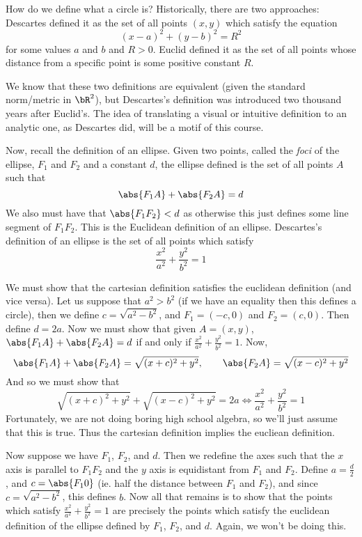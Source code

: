 How do we define what a circle is?
Historically, there are two approaches: Descartes defined it as the set of all points $(x,y)$ which satisfy the equation
\[ (x-a)^2 + (y-b)^2 = R^2 \]
for some values $a$ and $b$ and $R>0$.
Euclid defined it as the set of all points whose distance from a specific point is some positive constant $R$.

We know that these two definitions are equivalent (given the standard norm/metric in $\bR^2$), but Descartes's definition was introduced two thousand years after Euclid's.
The idea of translating a visual or intuitive definition to an analytic one, as Descartes did, will be a motif of this course.

Now, recall the definition of an ellipse.
Given two points, called the \emph{foci} of the ellipse, $F_1$ and $F_2$ and a constant $d$, the ellipse defined is the set of all points $A$ such that
\[ \abs{F_1A} + \abs{F_2A} = d \]
We also must have that $\abs{F_1F_2}<d$ as otherwise this just defines some line segment of $F_1F_2$.
This is the Euclidean definition of an ellipse.
Descartes's definition of an ellipse is the set of all points which satisfy
\[ \frac{x^2}{a^2} + \frac{y^2}{b^2} = 1 \]

We must show that the cartesian definition satisfies the euclidean definition (and vice versa).
Let us suppose that $a^2>b^2$ (if we have an equality then this defines a circle), then we define $c=\sqrt{a^2-b^2}$, and $F_1=(-c,0)$ and $F_2=(c,0)$.
Then define $d=2a$.
Now we must show that given $A=(x,y)$, $\abs{F_1A}+\abs{F_2A}=d$ if and only if $\frac{x^2}{a^2} + \frac{y^2}{b^2} = 1$.
Now,
\[ \abs{F_1A} + \abs{F_2A} = \sqrt{(x+c)^2 + y^2},\qquad \abs{F_2A} = \sqrt{(x-c)^2 + y^2} \]
And so we must show that
\[ \sqrt{(x+c)^2 + y^2} + \sqrt{(x-c)^2 + y^2} = 2a \iff \frac{x^2}{a^2} + \frac{y^2}{b^2} = 1 \]
Fortunately, we are not doing boring high school algebra, so we'll just assume that this is true.
Thus the cartesian definition implies the eucliean definition.

Now suppose we have $F_1$, $F_2$, and $d$.
Then we redefine the axes such that the $x$ axis is parallel to $F_1F_2$ and the $y$ axis is equidistant from $F_1$ and $F_2$.
Define $a=\frac d2$, and $c=\abs{F_10}$ (ie. half the distance between $F_1$ and $F_2$), and since $c=\sqrt{a^2-b^2}$, this defines $b$.
Now all that remains is to show that the points which satisfy $\frac{x^2}{a^2}+\frac{y^2}{b^2}=1$ are precisely the points which satisfy the euclidean definition of the ellipse defined by $F_1$, $F_2$, and
$d$.
Again, we won't be doing this.

